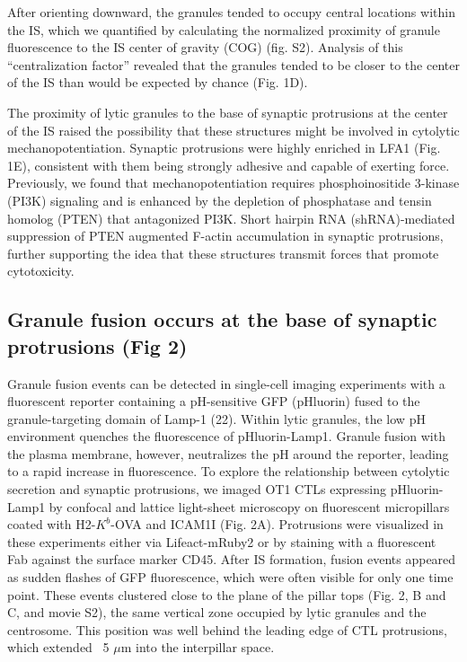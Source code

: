 After orienting downward, the granules tended to occupy central locations within the IS, which we quantified by calculating the normalized proximity of granule fluorescence to the IS center of gravity (COG) (fig. S2). Analysis of this “centralization factor” revealed that the granules tended to be closer to the center of the IS than would be expected by chance (Fig. 1D).

The proximity of lytic granules to the base of synaptic protrusions at the center of the IS raised the possibility that these structures might be involved in cytolytic mechanopotentiation. Synaptic protrusions were highly enriched in LFA1 (Fig. 1E), consistent with them being strongly adhesive and capable of exerting force. Previously, we found that mechanopotentiation requires phosphoinositide 3-kinase (PI3K) signaling and is enhanced by the depletion of phosphatase and tensin homolog (PTEN) that antagonized PI3K. Short hairpin RNA (shRNA)-mediated suppression of PTEN augmented F-actin accumulation in synaptic protrusions, further supporting the idea that these structures transmit forces that promote cytotoxicity.

\subsection{Granule fusion occurs at the base of synaptic protrusions (Fig 2)}
Granule fusion events can be detected in single-cell imaging experiments with a fluorescent reporter containing a pH-sensitive GFP (pHluorin) fused to the granule-targeting domain of Lamp-1 (22). Within lytic granules, the low pH environment quenches the fluorescence of pHluorin-Lamp1. Granule fusion with the plasma membrane, however, neutralizes the pH around the reporter, leading to a rapid increase in fluorescence. To explore the relationship between cytolytic secretion and synaptic protrusions, we imaged OT1 CTLs expressing pHluorin-Lamp1 by confocal and lattice  light-sheet
microscopy on fluorescent micropillars coated with H2-$K^{b}$-OVA and ICAM1I (Fig. 2A). Protrusions were visualized in these experiments either via Lifeact-mRuby2 or by staining with a fluorescent Fab against the surface marker CD45. After IS formation, fusion events appeared as sudden flashes of GFP fluorescence, which were often visible for only one time point. These events clustered close to the plane of the pillar tops (Fig. 2, B and C, and movie S2), the same vertical zone occupied by lytic granules and the centrosome. This position was well behind the leading edge of CTL protrusions, which extended ~5 $\mu$m into the interpillar space.

